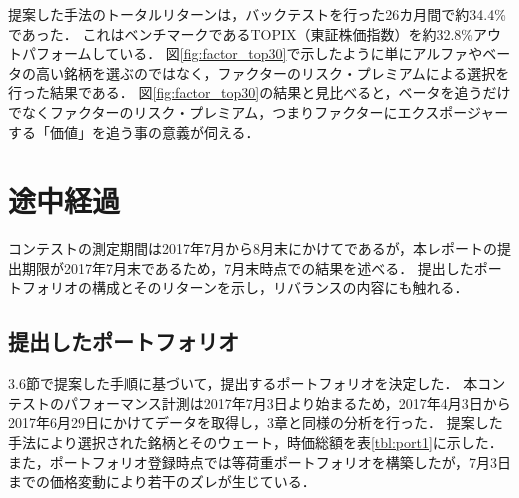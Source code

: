 ﻿\documentclass[a4paper]{jarticle}
\begin{document}
提案した手法のトータルリターンは，バックテストを行った26カ月間で約34.4\%であった．
これはベンチマークであるTOPIX（東証株価指数）を約32.8\%アウトパフォームしている．
図\ref{fig:factor_top30}で示したように単にアルファやベータの高い銘柄を選ぶのではなく，ファクターのリスク・プレミアムによる選択を行った結果である．
図\ref{fig:factor_top30}の結果と見比べると，ベータを追うだけでなくファクターのリスク・プレミアム，つまりファクターにエクスポージャーする「価値」を追う事の意義が伺える．

\section{途中経過}
コンテストの測定期間は2017年7月から8月末にかけてであるが，本レポートの提出期限が2017年7月末であるため，7月末時点での結果を述べる．
提出したポートフォリオの構成とそのリターンを示し，リバランスの内容にも触れる．
\subsection{提出したポートフォリオ}
3.6節で提案した手順に基づいて，提出するポートフォリオを決定した．
本コンテストのパフォーマンス計測は2017年7月3日より始まるため，2017年4月3日から2017年6月29日にかけてデータを取得し，3章と同様の分析を行った．
提案した手法により選択された銘柄とそのウェート，時価総額を表\ref{tbl:port1}に示した．
また，ポートフォリオ登録時点では等荷重ポートフォリオを構築したが，7月3日までの価格変動により若干のズレが生じている．
\end{document}

